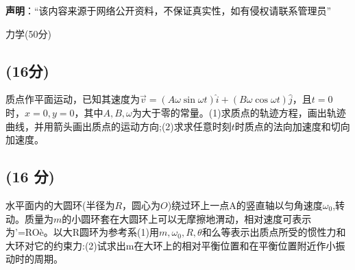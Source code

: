 
\textbf{声明}：“该内容来源于网络公开资料，不保证真实性，如有侵权请联系管理员”

力学(50分)
\subsection{(16分)}
质点作平面运动，已知其速度为$\vec{v} = (A \omega \sin \omega t) \hat{i} + (B \omega \cos \omega t) \hat{j}$，且$t=0$时，$x=0,y=0$，其中$A,B,\omega$为大于零的常量。(1)求质点的轨迹方程，画出轨迹曲线，并用箭头画出质点的运动方向;(2)求求任意时刻$t$时质点的法向加速度和切向
加速度。
\subsection{(16 分)}
水平面内的大圆环(半径为$R$，圆心为$O$)绕过环上一点A的竖直轴以匀角速度$\omega_0$,转动。质量为$m$的小圆环套在大圆环上可以无摩擦地渭动，相对速度可表示为’=ROè。以大R圆环为参考系(1)用$m,\omega_0,R,\theta$和么等表示出质点所受的惯性力和大环对它的约束力:(2)试求出m在大环上的相对平衡位置和在平衡位置附近作小振动时的周期。






